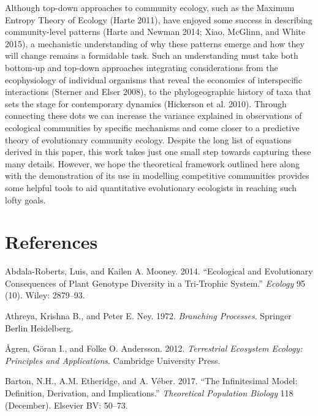 \documentclass[]{article}
\begin{document}
Although top-down approaches to community ecology, such as the Maximum
Entropy Theory of Ecology (Harte 2011), have enjoyed some success in
describing community-level patterns (Harte and Newman 2014; Xiao,
McGlinn, and White 2015), a mechanistic understanding of why these
patterns emerge and how they will change remains a formidable task. Such
an understanding must take both bottom-up and top-down approaches
integrating considerations from the ecophysiology of individual
organisms that reveal the economics of interspecific interactions
(Sterner and Elser 2008), to the phylogeographic history of taxa that
sets the stage for contemporary dynamics (Hickerson et al. 2010).
Through connecting these dots we can increase the variance explained in
observations of ecological communities by specific mechanisms and come
closer to a predictive theory of evolutionary community ecology. Despite
the long list of equations derived in this paper, this work takes just
one small step towards capturing these many details. However, we hope
the theoretical framework outlined here along with the demonstration of
its use in modelling competitive communities provides some helpful tools
to aid quantitative evolutionary ecologists in reaching such lofty
goals.

\newpage

\hypertarget{references}{%
\section*{References}\label{references}}

\hypertarget{refs}{}
\leavevmode\hypertarget{ref-AbdalaRoberts2014}{}%
Abdala-Roberts, Luis, and Kailen A. Mooney. 2014. ``Ecological and
Evolutionary Consequences of Plant Genotype Diversity in a Tri-Trophic
System.'' \emph{Ecology} 95 (10). Wiley: 2879--93.

\leavevmode\hypertarget{ref-Athreya1972}{}%
Athreya, Krishna B., and Peter E. Ney. 1972. \emph{Branching Processes}.
Springer Berlin Heidelberg.

\leavevmode\hypertarget{ref-9781107648258}{}%
Ågren, Göran I., and Folke O. Andersson. 2012. \emph{Terrestrial
Ecosystem Ecology: Principles and Applications}. Cambridge University
Press.

\leavevmode\hypertarget{ref-Barton2017}{}%
Barton, N.H., A.M. Etheridge, and A. Véber. 2017. ``The Infinitesimal
Model: Definition, Derivation, and Implications.'' \emph{Theoretical
Population Biology} 118 (December). Elsevier BV: 50--73.
\end{document}
